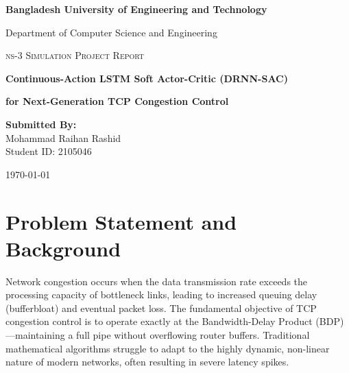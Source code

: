 \documentclass[12pt, a4paper]{article}
\begin{document}
\begin{titlepage}
    \centering
    \vspace*{2cm}
    
    {\Huge \bfseries Bangladesh University of Engineering and Technology\par}
    \vspace{1cm}
    {\Large Department of Computer Science and Engineering\par}
    
    \vspace{3cm}
    
    {\Large \textsc{ns-3 Simulation Project Report}\par}
    \vspace{1cm}
    
    {\Huge \bfseries Continuous-Action LSTM Soft Actor-Critic (DRNN-SAC) \par}
    \vspace{0.5cm}
    {\LARGE \bfseries for Next-Generation TCP Congestion Control \par}
    
    \vspace{4cm}
    
    {\Large \bfseries Submitted By:}\\[0.5cm]
    {\Large Mohammad Raihan Rashid}\\
    {\Large Student ID: 2105046}\\
    
    \vfill
    
    {\large \today\par}
\end{titlepage}

\clearpage

\section{Problem Statement and Background}

Network congestion occurs when the data transmission rate exceeds the processing capacity of bottleneck links, leading to increased queuing delay (bufferbloat) and eventual packet loss. The fundamental objective of TCP congestion control is to operate exactly at the Bandwidth-Delay Product (BDP)---maintaining a full pipe without overflowing router buffers. Traditional mathematical algorithms struggle to adapt to the highly dynamic, non-linear nature of modern networks, often resulting in severe latency spikes.
\end{document}
